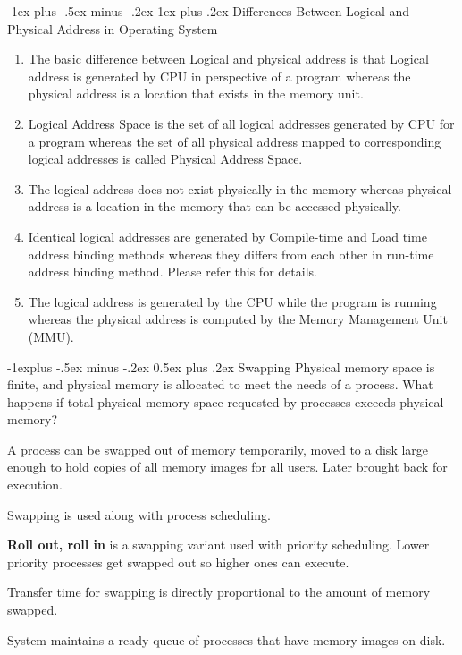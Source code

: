 \documentclass[8pt,landscape]{article}
\makeatletter
\renewcommand{\subsection}{\@startsection{subsection}{2}{0mm}%
                                {-1explus -.5ex minus -.2ex}%
                                {0.5ex plus .2ex}%
                                {\normalfont\scriptsize\bfseries}}
\renewcommand{\subsubsection}{\@startsection{subsubsection}{3}{0mm}%
                                {-1ex plus -.5ex minus -.2ex}%
                                {1ex plus .2ex}%
                                {\normalfont\tiny\bfseries}}
\makeatother
\begin{document}
\begin{multicols}{3}
\begin{tiny}
	\subsubsection{Differences Between Logical and Physical Address in Operating System}
	\begin{enumerate}[noitemsep]
		\item The basic difference between Logical and physical address is that Logical address is generated by CPU in perspective of a program whereas the physical address is a location that exists in the memory unit.
		\item Logical Address Space is the set of all logical addresses generated by CPU for a program whereas the set of all physical address mapped to corresponding logical addresses is called Physical Address Space.
		\item The logical address does not exist physically in the memory whereas physical address is a location in the memory that can be accessed physically.
		\item Identical logical addresses are generated by Compile-time and Load time address binding methods whereas they differs from each other in run-time address binding method. Please refer this for details.
		\item The logical address is generated by the CPU while the program is running whereas the physical address is computed by the Memory Management Unit (MMU).
	\end{enumerate}

	\subsection{Swapping}
	Physical memory space is finite, and physical memory is allocated to meet the needs of a 
	process. What happens if total physical memory space requested by processes exceeds physical
	memory?

	A process can be swapped out of memory temporarily, moved to a disk large enough to hold
	copies of all memory images for all users. Later brought back for execution.

	Swapping is used along with process scheduling.

	\textbf{Roll out, roll in} is a swapping
	variant used with priority scheduling. Lower priority processes get swapped out so higher
	ones can execute.

	Transfer time for swapping is directly proportional to the amount of memory swapped. 

	System maintains a ready queue of processes that have memory images on disk.
	

\end{tiny}
\end{multicols}
\end{document}
